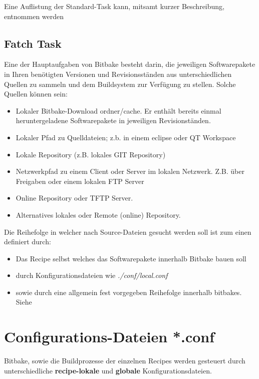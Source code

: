 Eine Auflistung der Standard-Task kann, mitsamt kurzer Beschreibung,
entnommen werden
\cite[S. 171-172]{Gonzalez2018:Embedded_Linux_Development_Using_Yocto_Project_Cookbook_2nd}

\subsection{Fatch Task}%
\label{sub:fatch_task}
Eine der Hauptaufgaben von Bitbake besteht darin, die jeweiligen
Softwarepakete in Ihren benötigten Versionen und Revisionsständen aus
unterschiedlichen Quellen zu sammeln und dem Buildsystem zur Verfügung
zu stellen. Solche Quellen können sein:

\begin{itemize}
    \item Lokaler Bitbake-Download ordner/cache. Er enthält bereits einmal
        heruntergeladene Softwarepakete in jeweiligen Revisionständen.
    \item Lokaler Pfad zu Quelldateien; z.b. in einem eclipse oder QT Workspace
    \item Lokale Repository (z.B. lokales GIT Repository)
    \item Netzwerkpfad zu einem Client oder Server im lokalen Netzwerk. Z.B.
        über Freigaben oder einem lokalen FTP Server
    \item Online Repository oder TFTP Server.
    \item Alternatives lokales oder Remote (online) Repository.
\end{itemize}

Die Reihe\-folge in welcher nach Source-Dateien gesucht werden soll ist zum
einen definiert durch:

\begin{itemize}
    \item Das Recipe selbst welches das Software\-pakete innerhalb Bitbake bauen
        soll
    \item durch Konfigurationsdateien wie \textit{./conf/local.conf}
    \item sowie durch eine allgemein fest vorgegeben Reihefolge innerhalb
    bitbakes. Siehe
    \cite[S.53]{Gonzalez2018:Embedded_Linux_Development_Using_Yocto_Project_Cookbook_2nd}
\end{itemize}

\section{Configurations-Dateien *.conf}%
\label{sec:configurations_dateien_conf}
Bitbake, sowie die Buildprozesse der einzelnen Recipes
werden gesteuert durch unterschiedliche \textbf{recipe-lokale} und
\textbf{globale} Konfigurationsdateien.



